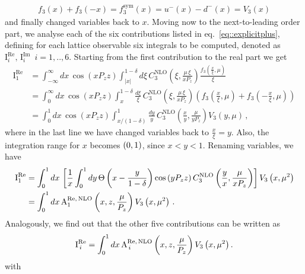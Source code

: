 \begin{align} 
	f_3\left(x\right)+f_3\left(-x\right) = f_3^{\text{sym}}\left(x\right) = u^-\left(x\right) - d^-\left(x\right) = V_3\left(x\right) 
\end{align}
and finally changed variables back to $x$.  
Moving now to the next-to-leading order part, we analyse each of the six contributions listed in
eq.~\eqref{eq::explicitplus}, defining for each lattice observable six integrals
to be computed, denoted as
$\text{I}^{\text{Re}}_i,\,\text{I}^{\text{Im}}_i\,\,\, i = 1,..,6$. Starting
from the first contribution to the real part we get
\begin{align}
	\text{I}^{\text{Re}}_1 
	  & =\int_{-\infty}^{\infty} dx\, \cos\left(x P_z z\right)
	  \int_{|x|}^{1-\delta}d\xi\, 
	  C_3^{\text{NLO}}\left(\xi,\frac{\mu\,\xi}{xP_z}\right)
	  \frac{f_3\left(\frac{x}{\xi},\mu\right)}{\xi} \nonumber \\
	  & = \int_{0}^{\infty} dx\, \cos\left(x P_z z\right)
	  \int_{x}^{1-\delta}\frac{d\xi}{\xi}\,
	  C_3^{\text{NLO}}\left(\xi,\frac{\mu\,\xi}{xP_z}\right)
	  \left(f_3\left(\frac{x}{\xi},\mu\right) + 
	  f_3\left(-\frac{x}{\xi},\mu\right) \right) \nonumber \\
	  & =\int_{0}^{1} dx\, \cos\left(x P_z z\right)
	  \int_{x/(1-\delta)}^{1}\frac{dy}{y}\,
	  C_3^{\text{NLO}}\left(\frac{x}{y},\frac{\mu}{y P_z}\right) V_3\left(y,\mu\right)\, ,
\end{align}
where in the last line we have changed variables back to $\frac{x}{\xi} = y$.
Also, the integration range for $x$ becomes $\left( 0,1 \right)$, since $x<y<1$.
Renaming variables, we have
\begin{align}
	\text{I}^{\text{Re}}_1 
	  & = \int_{0}^{1}dx\,
	  	\left[
			  \frac{1}{x}\int_{0}^{1} dy\, 
			  \Theta\left( x - \frac{y}{1-\delta} \right)
			  \cos\left(y P_z z\right) 
			  C_3^{\text{NLO}}\left(\frac{y}{x},\frac{\mu}{x P_z}\right)
		\right]
	V_3\left(x,\mu^2\right) \nonumber \\
	  & = \int_{0}^{1}dx\, 
		  \text{A}^{\text{Re},\,\text{NLO}}_1 \left( x, z, \frac{\mu}{P_z} \right) 
		  V_3\left(x,\mu^2\right)\, . 
\end{align}
Analogously, we find out that the other five contributions can be written as 
\begin{align}
	\text{I}^{\text{Re}}_{\,i} =
	\int_{0}^{1}dx\, \text{A}^{\text{Re},\,\text{NLO}}_{\,i} \left( x, z, \frac{\mu}{P_z} \right) V_3\left(x,\mu^2\right). 
\end{align}
with
